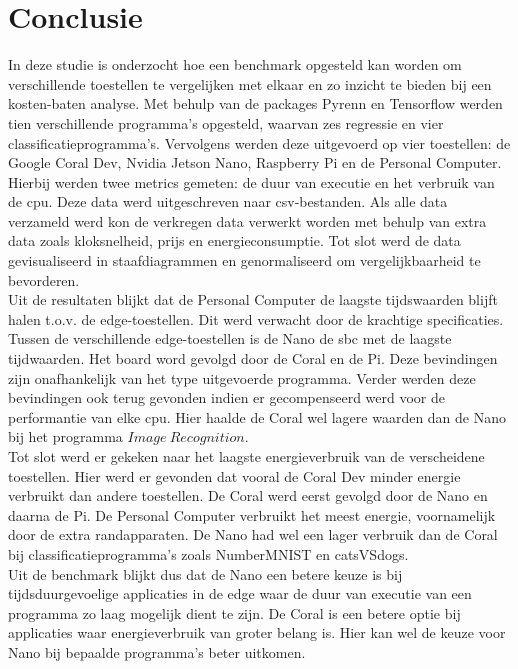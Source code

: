 \chapter{Conclusie}


In deze studie is onderzocht hoe een benchmark opgesteld kan worden om verschillende toestellen te vergelijken met elkaar en zo inzicht te bieden bij een kosten-baten analyse. Met behulp van de packages Pyrenn en Tensorflow werden tien verschillende programma's opgesteld, waarvan zes regressie en vier classificatieprogramma's. Vervolgens werden deze uitgevoerd op vier toestellen: de Google Coral Dev, Nvidia Jetson Nano, Raspberry Pi en de Personal Computer. Hierbij werden twee metrics gemeten: de duur van executie en het verbruik van de \gls{cpu}. Deze data werd uitgeschreven naar \gls{csv}-bestanden. Als alle data verzameld werd kon de verkregen data verwerkt worden met behulp van extra data zoals kloksnelheid, prijs en energieconsumptie. Tot slot werd de data gevisualiseerd in staafdiagrammen en genormaliseerd om vergelijkbaarheid te bevorderen. \\

Uit de resultaten blijkt dat de Personal Computer de laagste tijdswaarden blijft halen t.o.v. de edge-toestellen. Dit werd verwacht door de krachtige specificaties. Tussen de verschillende edge-toestellen is de Nano de \gls{sbc} met de laagste tijdwaarden. Het board word gevolgd door de Coral en de Pi. Deze bevindingen zijn onafhankelijk van het type uitgevoerde programma. Verder werden deze bevindingen ook terug gevonden indien er gecompenseerd werd voor de performantie van elke \gls{cpu}. Hier haalde de Coral wel lagere waarden dan de Nano bij het programma $Image ~Recognition$. \\

Tot slot werd er gekeken naar het laagste energieverbruik van de verscheidene toestellen. Hier werd er gevonden dat vooral de Coral Dev minder energie verbruikt dan andere toestellen. De Coral werd eerst gevolgd door de Nano en daarna de Pi. De Personal Computer verbruikt het meest energie, voornamelijk door de extra randapparaten. De Nano had wel een lager verbruik dan de Coral bij classificatieprogramma's zoals NumberMNIST en catsVSdogs. \\

Uit de benchmark blijkt dus dat de Nano een betere keuze is bij tijdsduurgevoelige applicaties in de edge waar de duur van executie van een programma zo laag mogelijk dient te zijn. De Coral is een betere optie bij applicaties waar energieverbruik van groter belang is. Hier kan wel de keuze voor Nano bij bepaalde programma's beter uitkomen.


